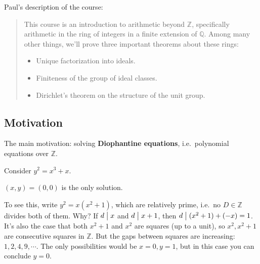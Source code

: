 Paul's description of the course:

\begin{quote}
This course is an introduction to arithmetic beyond \({\mathbb{Z}}\),
specifically arithmetic in the ring of integers in a finite extension of
\({\mathbb{Q}}\). Among many other things, we'll prove three important
theorems about these rings:

\begin{itemize}
\tightlist
\item
  Unique factorization into ideals.
\item
  Finiteness of the group of ideal classes.
\item
  Dirichlet's theorem on the structure of the unit group.
\end{itemize}
\end{quote}

\hypertarget{motivation}{%
\subsection{Motivation}\label{motivation}}

\begin{remark}

The main motivation: solving \textbf{Diophantine equations},
i.e.~polynomial equations over \({\mathbb{Z}}\).

\end{remark}

\begin{example}

Consider \(y^2 = x^3 + x\).

\begin{claim}

\((x, y) = (0, 0)\) is the only solution.

\end{claim}

To see this, write \(y^2 = x(x^2+1)\), which are relatively prime,
i.e.~no \(D\in {\mathbb{Z}}\) divides both of them. Why? If
\(d \bigm|x\) and \(d \bigm|x+1\), then \(d\bigm|(x^2+1) + (-x) = 1\).
It's also the case that both \(x^2+1\) and \(x^2\) are squares (up to a
unit), so \(x^2, x^2 + 1\) are consecutive squares in \({\mathbb{Z}}\).
But the gaps between squares are increasing: \(1, 2, 4, 9, \cdots\). The
only possibilities would be \(x=0, y=1\), but in this case you can
conclude \(y=0\).

\end{example}


